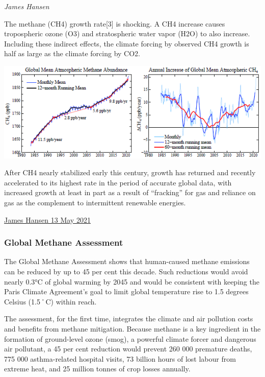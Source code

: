 \documentclass[
]{book}
\begin{document}
\emph{James Hansen}

The methane (CH4) growth rate{[}3{]} is shocking.
A CH4 increase causes tropospheric ozone (O3) and stratospheric water vapor (H2O)
to also increase.
Including these indirect effects, the climate forcing by observed CH4 growth
is half as large as the climate forcing by CO2.

\includegraphics{fig/CH4_Annual_Increase.png}

After CH4 nearly stabilized early this century, growth has returned and recently accelerated to its highest rate in the period of accurate global data, with increased growth at least in part as a result of ``fracking'' for gas and reliance on gas as the complement to intermittent renewable energies.

\href{https://mailchi.mp/caa/the-world-has-cooled-off-whats-the-significance}{James Hansen 13 May 2021}

\hypertarget{global-methane-assessment}{%
\subsubsection{Global Methane Assessment}\label{global-methane-assessment}}

The Global Methane Assessment shows that human-caused methane emissions can be reduced by up to 45 per cent this decade. Such reductions would avoid nearly 0.3°C of global warming by 2045 and would be consistent with keeping the Paris Climate Agreement's goal to limit global temperature rise to 1.5 degrees Celsius (1.5˚C) within reach.

The assessment, for the first time, integrates the climate and air pollution costs and benefits from methane mitigation. Because methane is a key ingredient in the formation of ground-level ozone (smog), a powerful climate forcer and dangerous air pollutant, a 45 per cent reduction would prevent 260 000 premature deaths, 775 000 asthma-related hospital visits, 73 billion hours of lost labour from extreme heat, and 25 million tonnes of crop losses annually.
\end{document}
